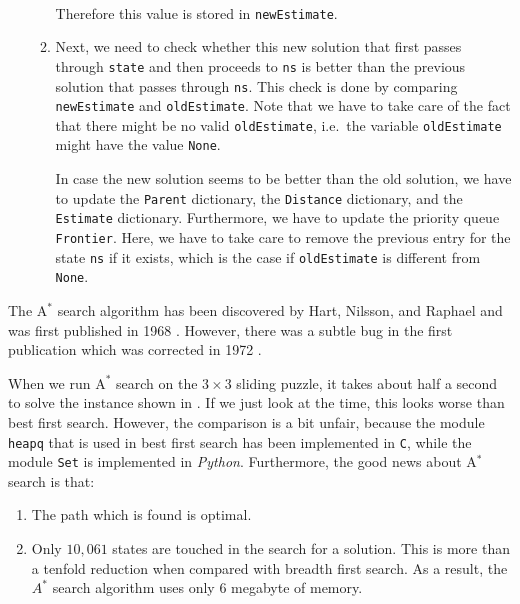 \begin{enumerate}
\begin{enumerate}
            \\[0.2cm]
            Therefore this value is stored in \texttt{newEstimate}.
      \item Next, we need to check whether this new solution that first passes through \texttt{state} and
            then proceeds to \texttt{ns} is better than the previous solution that passes through
            \texttt{ns}.  This check is done by comparing \texttt{newEstimate} and
            \texttt{oldEstimate}.  Note that we have to take care of the fact that there might be no valid
            \texttt{oldEstimate}, i.e.~the variable \texttt{oldEstimate} might have the value \texttt{None}.

            In case the new solution seems to be better than the old solution, we have to update
            the \texttt{Parent} dictionary, the \texttt{Distance} dictionary, and the \texttt{Estimate}
            dictionary.  Furthermore, we have to update the priority queue \texttt{Frontier}.
            Here, we have to take care to remove the previous entry for the state
            \texttt{ns} if it exists, which is the case if \texttt{oldEstimate} is different from \texttt{None}.
      \end{enumerate}
\end{enumerate}
The $\mathrm{A}^*$ search algorithm has been discovered by Hart, Nilsson, and Raphael and was first published in
1968 \cite{hart:1968}.  However, there was a subtle bug in the first publication which was corrected
in 1972 \cite{hart:1972}.

When we run $\mathrm{A}^*$ search on the $3 \times 3$ sliding puzzle, it takes about half a second to solve the instance
shown in .  If we just look at the time, this looks worse than best first search.  
However, the comparison is a bit unfair, because the module \texttt{heapq} that is used in best first search
has been implemented  in \texttt{C}, while the module \texttt{Set} is implemented in \textsl{Python}.
Furthermore, the good news about A$^*$ search is that:
\begin{enumerate}
\item The path which is found is optimal.
\item Only $10,061$ states are touched in the search for a solution.  This is more than a tenfold 
      reduction when compared with breadth first search.  As a result, the $A^*$ search algorithm uses only 6
      megabyte of memory.
\end{enumerate}

